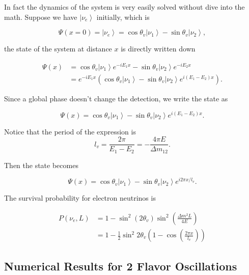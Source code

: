 \documentclass{tufte-handout}
\newcommand{\ket}[1]{\left| #1\right\rangle}
\begin{document}
In fact the dynamics of the system is very easily solved without dive into the math. Suppose we have $\ket{\nu_e}$ initially, which is

\begin{equation*}
\Psi(x=0)=\ket{\nu_e} = \cos \theta_v \ket{\nu_1} - \sin \theta_v \ket{\nu_2},
\end{equation*}

the state of the system at distance $x$ is directly written down

\begin{align*}
\Psi(x) &=  \cos \theta_v \ket{\nu_1} e^{-i E_1 x} - \sin \theta_v \ket{\nu_2} e^{-i E_2 x} \\
&= e^{-i E_1 x}( \cos \theta_v \ket{\nu_1}  - \sin \theta_v \ket{\nu_2} e^{i(E_1 - E_2) x}).
\end{align*}

Since a global phase doesn't change the detection, we write the state as

\begin{equation*}
\Psi(x) =  \cos \theta_v \ket{\nu_1}  - \sin \theta_v \ket{\nu_2} e^{i(E_1 - E_2) x} .
\end{equation*}

Notice that the period of the expression is 
\begin{equation*}
l_v = \frac{2\pi}{E_1 - E_2} = - \frac{4\pi E}{\Delta m_{12}}.
\end{equation*}


Then the state becomes

\begin{equation*}
\Psi(x) =  \cos \theta_v \ket{\nu_1}  - \sin \theta_v \ket{\nu_2} e^{i2\pi x/l_v} .
\end{equation*}



The survival probability for electron neutrinos is

\begin{align*}
P(\nu_e,L) &= 1-\sin^2(2\theta_v)\sin^2\left( \frac{\Delta m^2 L}{4E} \right) \\
&= 1- \frac{1}{2}\sin^2 2\theta_v \left(1- \cos\left( \frac{2\pi x}{l_v} \right) \right)
\end{align*}





\subsection{Numerical Results for 2 Flavor Oscillations}
\end{document}
